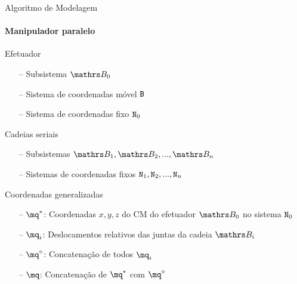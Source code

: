 \documentclass[25pt,landscape]{beamer}
\begin{document}
\begin{frame}{Algoritmo de Modelagem}
    \framesubtitle{Manipulador paralelo}
	\pause
    \begin{block}{Efetuador}
		\begin{itemize}
			\item[--] Subsistema $\ssB_0$
			\item[--] Sistema de coordenadas móvel $\mathtt{B}$
			\item[--] Sistema de coordenadas fixo $\mathtt{N}_0$
		\end{itemize}
    \end{block}
	\pause
    \begin{block}{Cadeias seriais}
		\begin{itemize}
			\item[--] Subsistemas $\ssB_1, \ssB_2,...,\ssB_n$
			\item[--] Sistemas de coordenadas fixos $\mathtt{N}_1, \mathtt{N}_2,...,\mathtt{N}_n$
		\end{itemize}
    \end{block}
	\pause
    \begin{block}{Coordenadas generalizadas}
		\begin{itemize}
			\item[--] $\mq^*$: Coordenadas $x,y,z$ do CM do efetuador $\ssB_0$ no sistema $\mathtt{N}_0$
			\item[--] $\mq_i$: Deslocamentos relativos das juntas da cadeia $\ssB_i$
			\item[--] $\mq^\diamond$: Concatenação de todos $\mq_i$ 
			\item[--] $\mq$: Concatenação de $\mq^*$ com $\mq^\diamond$
		\end{itemize}
    \end{block}
\end{frame}
\end{document}
